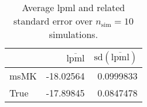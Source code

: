 \begin{table}[H]

\caption{Average lpml and related standard error over $n_{\text{sim}} = 10$ simulations.}
\centering
\begin{tabular}[t]{lrr}
\toprule
  & $\overbar{\text{lpml}}$ & $\text{sd}(\overbar{\text{lpml}})$\\
\midrule
msMK & -18.02564 & 0.0999833\\
True & -17.89845 & 0.0847478\\
\bottomrule
\end{tabular}
\end{table}